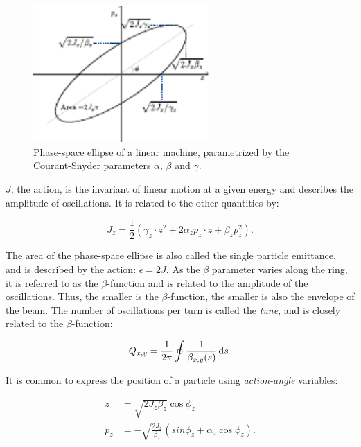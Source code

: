 \begin{figure}[htb]
    \centering
    \includegraphics[width=0.6\textwidth]{images/phase_space.pdf}
    \caption{Phase-space ellipse of a linear machine, parametrized by the Courant-Snyder
    parameters $\alpha$, $\beta$ and $\gamma$.}
    \label{fig:coordinate_systems:twiss}
\end{figure}

$J$, the action, is the invariant of linear motion at a given energy and describes the amplitude of
oscillations. It is related to the other quantities by:

\begin{equation}
    J_z = \frac{1}{2} (\gamma_z \cdot z^2 + 2 \alpha_z p_z \cdot z + \beta_z p_z^2).
    \label{eq:coordinate_systems:action}
\end{equation}

The area of the phase-space ellipse is also called the single particle emittance, and is described
by the action: 
$\epsilon = 2J$.  As the $\beta$ parameter varies along the ring, it is referred to as the
$\beta$-function and is related to the amplitude of the oscillations. Thus, the smaller is the
$\beta$-function, the smaller is also the envelope of the beam.
The number of oscillations per turn is called the \textit{tune}, and is closely related to the
$\beta$-function:

\begin{equation}
    Q_{x,y} = \frac{1}{2 \pi} \oint \frac{1}{\beta_{x,y}(s)} \mathop{}\!\mathrm{d} s.
    \label{eq:coordinate_systems:tune}
\end{equation}


It is common to express the position of a particle using \textit{action-angle} variables:

\begin{equation}
    \begin{aligned}
    z   &= \sqrt{2J_z \beta_z} \cos{\phi_z} \\
    p_z &= - \sqrt{\frac{2J_z}{\beta_z}} \left( sin{\phi_z} + \alpha_z \cos{\phi_z}\right).
    \end{aligned}
    \label{eq:coordinate_systems:action_angle}
\end{equation}


